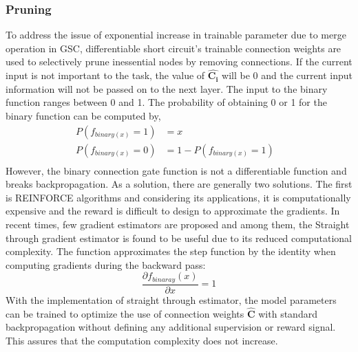 \documentclass{article}
\let\oldhat\hat
\renewcommand{\hat}[1]{\oldhat{\mathbf{#1}}}
\begin{document}
\subsubsection{Pruning}
\label{sec:Pruning}
To address the issue of exponential increase in trainable parameter due to merge operation in GSC, differentiable short circuit's trainable connection weights are used to selectively prune inessential nodes by removing connections.  If the current input is not important to the task, the value of $\hat{C_{i}}$ will be 0 and the current input information will not be passed on to the next layer. The input to the binary function ranges between 0 and 1. The probability of obtaining 0 or 1 for the binary function can be computed by,
\begin{equation}
\label{eq:ffn_math_representation}
\begin{aligned}
   P(f_{binary(x)}=1) &=x&\\
   P(f_{binary(x)}=0) &=1-P(f_{binary(x)}=1)&\\   
\end{aligned}
\end{equation}
However, the binary connection gate function is not a differentiable function and breaks backpropagation. As a solution, there are generally two solutions. The first is REINFORCE algorithms \cite{Williams1992SimpleSG} and considering its applications, it is computationally expensive and the reward is difficult to design to approximate the gradients. In recent times, few gradient estimators are proposed and among them, the Straight through gradient estimator \cite{Bengio2013EstimatingOP} is found to be useful due to its reduced computational complexity. The function approximates the step function by the identity when computing gradients during the backward pass:
\begin{equation}
\frac{\partial{f_{binaray}(x)}}{\partial x}=1
\end{equation}
With the implementation of straight through estimator, the model parameters can be trained to optimize the use of connection weights $\hat{C}$ with standard backpropagation without defining any additional supervision or reward signal. This assures that the computation complexity does not increase.
\end{document}
